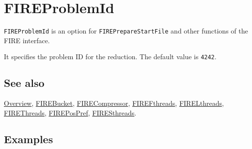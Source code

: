 \documentclass[../FeynHelpersManual.tex]{subfiles}
\begin{document}
\begin{Shaded}
\begin{Highlighting}[]
 
\end{Highlighting}
\end{Shaded}

\hypertarget{fireproblemid}{
\section{FIREProblemId}\label{fireproblemid}}

\texttt{FIREProblemId} is an option for \texttt{FIREPrepareStartFile}
and other functions of the FIRE interface.

It specifies the problem ID for the reduction. The default value is
\texttt{4242}.

\subsection{See also}

\hyperlink{toc}{Overview}, \hyperlink{firebucket}{FIREBucket},
\hyperlink{firecompressor}{FIRECompressor},
\hyperlink{firefthreads}{FIREFthreads},
\hyperlink{firelthreads}{FIRELthreads},
\hyperlink{firethreads}{FIREThreads},
\hyperlink{firepospref}{FIREPosPref},
\hyperlink{firesthreads}{FIRESthreads}.

\subsection{Examples}
\end{document}
